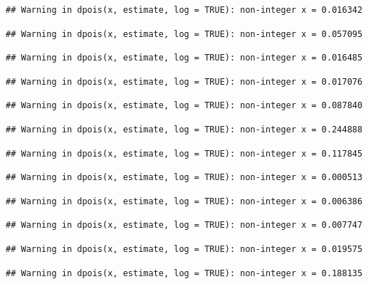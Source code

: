 \documentclass[]{article}
\begin{document}
\begin{verbatim}
## Warning in dpois(x, estimate, log = TRUE): non-integer x = 0.016342
\end{verbatim}

\begin{verbatim}
## Warning in dpois(x, estimate, log = TRUE): non-integer x = 0.057095
\end{verbatim}

\begin{verbatim}
## Warning in dpois(x, estimate, log = TRUE): non-integer x = 0.016485
\end{verbatim}

\begin{verbatim}
## Warning in dpois(x, estimate, log = TRUE): non-integer x = 0.017076
\end{verbatim}

\begin{verbatim}
## Warning in dpois(x, estimate, log = TRUE): non-integer x = 0.087840
\end{verbatim}

\begin{verbatim}
## Warning in dpois(x, estimate, log = TRUE): non-integer x = 0.244888
\end{verbatim}

\begin{verbatim}
## Warning in dpois(x, estimate, log = TRUE): non-integer x = 0.117845
\end{verbatim}

\begin{verbatim}
## Warning in dpois(x, estimate, log = TRUE): non-integer x = 0.000513
\end{verbatim}

\begin{verbatim}
## Warning in dpois(x, estimate, log = TRUE): non-integer x = 0.006386
\end{verbatim}

\begin{verbatim}
## Warning in dpois(x, estimate, log = TRUE): non-integer x = 0.007747
\end{verbatim}

\begin{verbatim}
## Warning in dpois(x, estimate, log = TRUE): non-integer x = 0.019575
\end{verbatim}

\begin{verbatim}
## Warning in dpois(x, estimate, log = TRUE): non-integer x = 0.188135
\end{verbatim}
\end{document}
